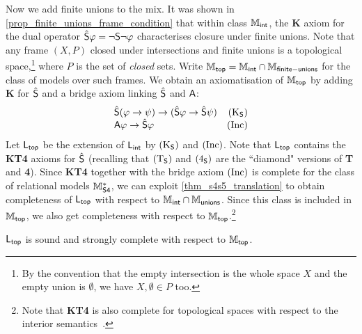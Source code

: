Now we add finite unions to the mix. It was shown in
\cref{prop_finite_unions_frame_condition} that within class $\Mint$, the
\textbf{K} axiom for the dual operator $\hat\S\phi = \neg\S\neg\phi$
characterises closure under finite unions. Note that any frame $(X, P)$ closed
under intersections and finite unions is a topological space,\footnote{By the
convention that the empty intersection is the whole space $X$ and the empty
union is $\emptyset$, we have $X, \emptyset \in P$ too.} where $P$ is the set
of \emph{closed} sets. Write $\Mtop = \Mint \cap \Mfunions$ for the class of
models over such frames. We obtain an axiomatisation of $\Mtop$ by adding
\textbf{K} for $\hat\S$ and a bridge axiom linking $\hat\S$ and $\A$:
\[
    \begin{array}{lr}
        \hat{\S}(\phi \limplies \psi) \limplies (\hat{\S}\phi \limplies \hat{\S}\psi)
            & \Ksoundness \\
        \A\phi \limplies \hat\S\phi
    & \inc
    \end{array}
\]
Let $\sLtop$ be the extension
of $\sLint$ by $\Ksoundness$ and $\inc$. Note that $\sLtop$ contains the
\textbf{KT4} axioms for $\hat\S$ (recalling that $\Tsoundness$ and
$\foursoundness$ are the ``diamond" versions of \textbf{T} and \textbf{4}).
Since \textbf{KT4} together with the bridge axiom $\inc$ is complete for the
class of relational models $\Msfour$, we can exploit
\cref{thm_s4s5_translation} to obtain completeness of $\sLtop$ with respect to
$\Mint \cap \Munions$. Since this class is included in $\Mtop$, we also get
completeness with respect to $\Mtop$.\footnote{Note that \textbf{KT4} is also
complete for topological spaces with respect to the interior
semantics~\citep{van2007modal}.}

\begin{theorem}
\label{thm_mtop_axiomatisation}
    $\sLtop$ is sound and strongly complete with respect to $\Mtop$.
\end{theorem}

